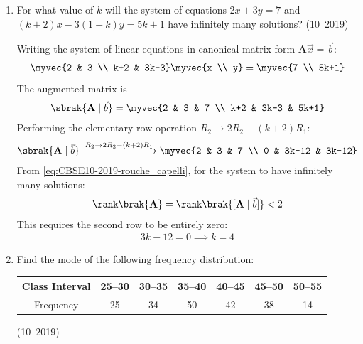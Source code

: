 \begin{enumerate}[label=\thesubsection.\arabic*, ref=\thesubsection.\theenumi]
	\solution
	The first term is $a = -\frac{9}{2}$. The common difference $d$ is:
	\begin{align}
		d = -3 - \brak{-\frac{9}{2}} = -3 + \frac{9}{2} = \frac{3}{2}
	\end{align}
	From \eqref{eq:CBSE10-2019-ap_nth_term}, the $n$-th term is:
	\begin{align}
		a_n = a + \brak{n - 1}d
	\end{align}
	Substituting $n = 21$:
	\begin{align}
		a_{21} &= -\frac{9}{2} + \brak{21 - 1}\brak{\frac{3}{2}} \\
		&= -\frac{9}{2} + 20\brak{\frac{3}{2}} = -\frac{9}{2} + 30 = \frac{51}{2} = 25\frac{1}{2}
	\end{align}
	
	\item For what value of $k$ will the system of equations $2x+3y=7$ and $(k+2)x-3(1-k)y=5k+1$ have infinitely many solutions?
	\hfill (10~2019)
	
	\solution
	Writing the system of linear equations in canonical matrix form $\mathbf{A}\vec{x} = \vec{b}$:
	\begin{align}
		\myvec{2 & 3 \\ k+2 & 3k-3}\myvec{x \\ y} = \myvec{7 \\ 5k+1}
	\end{align}
	The augmented matrix is
	\begin{align}
		\sbrak{\mathbf{A} \mid \vec{b}} = \myvec{2 & 3 & 7 \\ k+2 & 3k-3 & 5k+1}
	\end{align}
	Performing the elementary row operation $R_2 \to 2R_2 - (k+2)R_1$:
	\begin{align}
		\sbrak{\mathbf{A} \mid \vec{b}} \xrightarrow{R_2 \to 2R_2 - (k+2)R_1}
		\myvec{2 & 3 & 7 \\ 0 & 3k-12 & 3k-12}
	\end{align}
	From \eqref{eq:CBSE10-2019-rouche_capelli}, for the system to have infinitely many solutions:
	\begin{align}
		\rank\brak{\mathbf{A}} = \rank\brak{[\mathbf{A} \mid \vec{b}]} < 2
	\end{align}
	This requires the second row to be entirely zero:
	\begin{align}
		3k - 12 = 0 \implies k = 4
	\end{align}
	
	\item Find the mode of the following frequency distribution:
	\begin{center}
		\begin{tabular}{|c|c|c|c|c|c|c|}
			\hline
			Class Interval & 25--30 & 30--35 & 35--40 & 40--45 & 45--50 & 50--55\\
			\hline
			Frequency & 25 & 34 & 50 & 42 & 38 & 14\\
			\hline
		\end{tabular}
	\end{center}
	\hfill (10~2019)
	

\end{enumerate}
